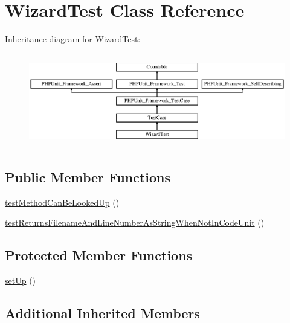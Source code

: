\hypertarget{class_sebastian_bergmann_1_1_code_unit_reverse_lookup_1_1_wizard_test}{}\section{Wizard\+Test Class Reference}
\label{class_sebastian_bergmann_1_1_code_unit_reverse_lookup_1_1_wizard_test}
Inheritance diagram for Wizard\+Test\+:\begin{figure}[H]
\begin{center}
\leavevmode
\includegraphics[height=4.129793cm]{class_sebastian_bergmann_1_1_code_unit_reverse_lookup_1_1_wizard_test}
\end{center}
\end{figure}
\subsection*{Public Member Functions}
\begin{DoxyCompactItemize}
\item 
\mbox{\hyperlink{class_sebastian_bergmann_1_1_code_unit_reverse_lookup_1_1_wizard_test_a77494210414b45222dc9db0234a3e28a}{test\+Method\+Can\+Be\+Looked\+Up}} ()
\item 
\mbox{\hyperlink{class_sebastian_bergmann_1_1_code_unit_reverse_lookup_1_1_wizard_test_a39a2c3d3bcf905ec95cf61a844a6e3db}{test\+Returns\+Filename\+And\+Line\+Number\+As\+String\+When\+Not\+In\+Code\+Unit}} ()
\end{DoxyCompactItemize}
\subsection*{Protected Member Functions}
\begin{DoxyCompactItemize}
\item 
\mbox{\hyperlink{class_sebastian_bergmann_1_1_code_unit_reverse_lookup_1_1_wizard_test_a0bc688732d2b3b162ffebaf7812e78da}{set\+Up}} ()
\end{DoxyCompactItemize}
\subsection*{Additional Inherited Members}


